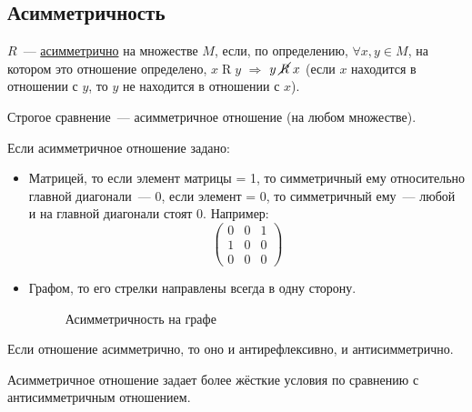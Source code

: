 \documentclass[russian]{lecture-notes}
\theoremstyle{definition}
\newcommand{\R}[2]{$#1\mathrel{R}#2$}
\newcommand{\UR}[2]{$#1\mathrel{\cancel{R}}#2$}
\begin{document}
\subsection{Асимметричность}
\label{opr:asimmetr}
\begin{definition}
	$R$~--- \underline{асимметрично} на множестве $M$, если, по определению, $\forall x, y \in M$, на котором это отношение определено, \R{x}{y} $\Rightarrow$ \UR{y}{x} (если $x$ находится в отношении с $y$, то $y$ не находится в отношении с $x$).
\end{definition}

\begin{example}
	Строгое сравнение~--- асимметричное отношение (на любом множестве).
\end{example}

Если асимметричное отношение задано:
\begin{itemize}
	\item Матрицей, то если элемент матрицы = 1, то симметричный ему относительно главной диагонали~--- 0, если элемент = 0, то симметричный ему~--- любой и на главной диагонали стоят 0. Например:
	\begin{equation*}
	\left(
	\begin{array}{cccc}
	0 & 0 & 1\\
	1 & 0 & 0\\
	0 & 0 & 0
	\end{array}
	\right) 
	\end{equation*}
	
	\item Графом, то его стрелки направлены всегда в одну сторону.
	\begin{figure}[H]
		\centering
		\caption{\small Асимметричность на графе}
		\label{fig:asimmetr}
	\end{figure}
\end{itemize}

\begin{note*}
	Если отношение асимметрично, то оно и антирефлексивно, и антисимметрично.
\end{note*}

\begin{note*}
	Асимметричное отношение задает более жёсткие условия по сравнению с антисимметричным отношением.
\end{note*}
\end{document}
